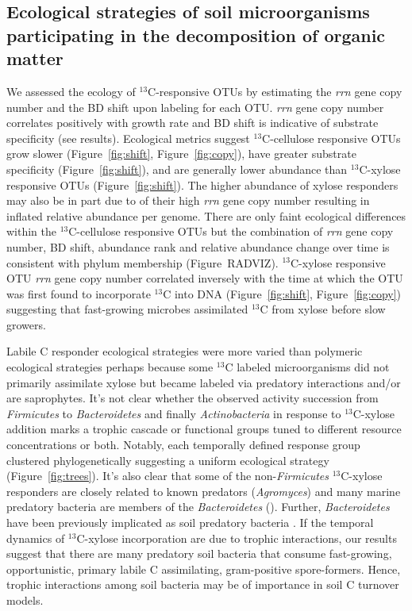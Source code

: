 \subsection{Ecological strategies of soil microorganisms participating in the
decomposition of organic matter}
We assessed the ecology of $^{13}$C-responsive OTUs by estimating the
\textit{rrn} gene copy number and the BD shift upon labeling for each OTU.
\textit{rrn} gene copy number correlates positively with growth rate
\citep{11125085} and BD shift is indicative of substrate specificity (see
results). Ecological metrics suggest $^{13}$C-cellulose responsive OTUs grow
slower (Figure~\ref{fig:shift}, Figure~\ref{fig:copy}), have greater substrate
specificity (Figure~\ref{fig:shift}), and are generally lower abundance than
$^{13}$C-xylose responsive OTUs (Figure~\ref{fig:shift}). The higher abundance
of xylose responders may also be in part due to of their high \textit{rrn} gene
copy number resulting in inflated relative abundance per genome. 
There are only faint ecological differences within the $^{13}$C-cellulose
responsive OTUs but the combination of \textit{rrn} gene copy number, BD shift,
abundance rank and relative abundance change over time is consistent with
phylum membership (Figure~RADVIZ). $^{13}$C-xylose responsive OTU \textit{rrn}
gene copy number correlated inversely with the time at which the OTU was first
found to incorporate $^{13}$C into DNA (Figure~\ref{fig:shift},
Figure~\ref{fig:copy}) suggesting that fast-growing microbes assimilated
$^{13}$C from xylose before slow growers.  

Labile C responder ecological strategies were more varied than polymeric
ecological strategies perhaps because some $^{13}$C labeled microorganisms did
not primarily assimilate xylose but became labeled via predatory interactions
and/or are saprophytes. It's not clear whether the observed activity succession
from \textit{Firmicutes} to \textit{Bacteroidetes} and finally
\textit{Actinobacteria} in response to $^{13}$C-xylose addition marks a trophic
cascade or functional groups tuned to different resource concentrations or
both. Notably, each temporally defined response group clustered
phylogenetically suggesting a uniform ecological strategy
(Figure~\ref{fig:trees}). It's also clear that some of the
non-\textit{Firmicutes} $^{13}$C-xylose responders are closely related to known
predators (\textit{Agromyces}) and many marine predatory bacteria are members
of the \textit{Bacteroidetes} (\citep{Banning2010a}). Further,
\textit{Bacteroidetes} have been previously implicated as soil predatory
bacteria \citep{Lueders2006}. If the temporal dynamics of $^{13}$C-xylose
incorporation are due to trophic interactions, our results suggest that there
are many predatory soil bacteria that consume fast-growing, opportunistic,
primary labile C assimilating, gram-positive spore-formers. Hence, trophic
interactions among soil bacteria may be of importance in soil C turnover
models.

